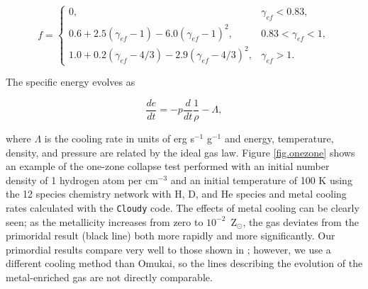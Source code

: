 \begin{equation}
f = \left\{
  \begin{array}{ll}
  0, & \gamma_{ef} < 0.83,\\
  0.6 + 2.5 (\gamma_{ef} - 1) - 6.0 (\gamma_{ef} - 1)^{2}, & 0.83 <
  \gamma_{ef} < 1,\\
  1.0 + 0.2 (\gamma_{ef} - 4/3) - 2.9 (\gamma_{ef} - 4/3)^{2}, & \gamma_{ef} > 1.
\end{array} \right.
\end{equation}

The specific energy evolves as

\begin{equation}
\frac{de}{dt} = -p \frac{d}{dt} \frac{1}{\rho} - \Lambda,
\end{equation}

where $\Lambda$ is the cooling rate in units of erg s$^{-1}$ g$^{-1}$
and energy, temperature, density, and pressure are related by the
ideal gas law.  Figure \ref{fig.onezone} shows an example of the
one-zone collapse test performed with an initial number density of 1
hydrogen atom per cm$^{-3}$ and an initial temperature of 100 K using
the 12 species chemistry network with H, D, and He species and metal
cooling rates calculated with the \texttt{Cloudy} code.  The effects
of metal cooling can be clearly seen; as the metallicity increases
from zero to $10^{-2}$~Z$_\odot$, the gas deviates from the primoridal
result (black line) both more rapidly and more significantly.  Our
primordial results compare very well to those shown in
\citet{2005ApJ...626..627O}; however, we use a different cooling
method than Omukai, so the lines describing the evolution of the
metal-enriched gas are not directly comparable.

